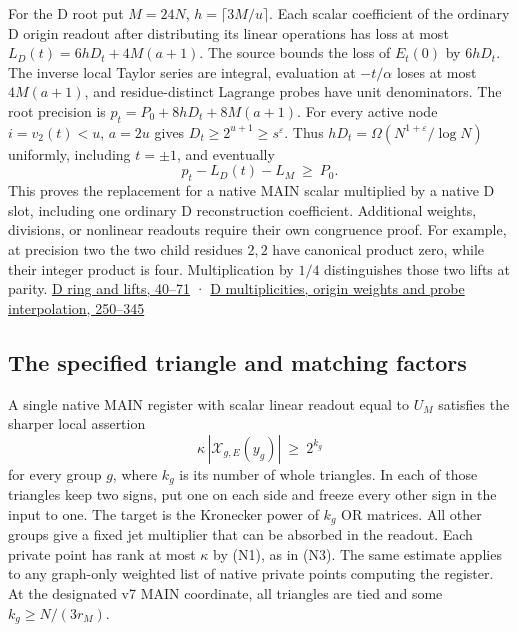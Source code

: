 \documentclass[11pt,a4paper]{article}
\begin{document}
For the D root put \(M=24N\), \(h=\lceil3M/u\rceil\). Each scalar
coefficient of the ordinary D origin readout after distributing its
linear operations has loss at most \(L_D(t)=6hD_t+4M(a+1)\). The source
bounds the loss of \(E_t(0)\) by \(6hD_t\). The inverse local Taylor
series are integral, evaluation at \(-t/\alpha\) loses at most
\(4M(a+1)\), and residue-distinct Lagrange probes have unit
denominators. The root precision is \(p_t=P_0+8hD_t+8M(a+1)\). For every
active node \(i=v_2(t)<u\), \(a=2u\) gives
\(D_t\ge2^{u+1}\ge s^\varepsilon\). Thus
\(hD_t=\Omega(N^{1+\varepsilon}/\log N)\) uniformly, including
\(t=\pm1\), and eventually \[
 p_t-L_D(t)-L_M\ \ge\ P_0.
\] This proves the replacement for a native MAIN scalar multiplied by a
native D slot, including one ordinary D reconstruction coefficient.
Additional weights, divisions, or nonlinear readouts require their own
congruence proof. For example, at precision two the two child residues
\(2,2\) have canonical product zero, while their integer product is
four. Multiplication by \(1/4\) distinguishes those two lifts at parity.
\href{https://github.com/openai/math/blob/main/preprints/The-Exponential-Time-Hypothesis-is-False-October-25-2026/build/quantitative-contraction.tex\#L40}{D
ring and lifts, 40--71} ·
\href{https://github.com/openai/math/blob/main/preprints/The-Exponential-Time-Hypothesis-is-False-October-25-2026/build/quantitative-contraction.tex\#L250}{D
multiplicities, origin weights and probe interpolation, 250--345}

\subsection{The specified triangle and matching
factors}\label{v8-the-specified-triangle-and-matching-factors}

A single native MAIN register with scalar linear readout equal to
\(U_M\) satisfies the sharper local assertion \[
 \kappa\,|\mathcal X_{g,E}(y_g)|\ \ge\ 2^{k_g}
\tag{N6}
\] for every group \(g\), where \(k_g\) is its number of whole
triangles. In each of those triangles keep two signs, put one on each
side and freeze every other sign in the input to one. The target is the
Kronecker power of \(k_g\) OR matrices. All other groups give a fixed
jet multiplier that can be absorbed in the readout. Each private point
has rank at most \(\kappa\) by (N1), as in (N3). The same estimate
applies to any graph-only weighted list of native private points
computing the register. At the designated v7 MAIN coordinate, all
triangles are tied and some \(k_g\ge N/(3r_M)\).
\end{document}
